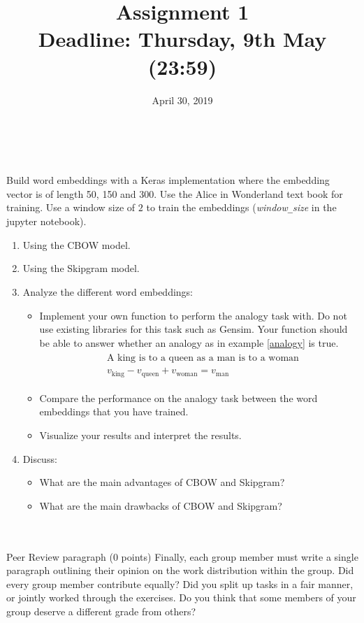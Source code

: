\documentclass[a4paper,twoside,11pt]{article}
\title{\vspace{-\baselineskip}\sffamily\bfseries Assignment 1 \\
\large Deadline: Thursday, 9th May (23:59)}
\date{April 30, 2019}
\newcommand{\exercise}[2]{\noindent{\bf Question #1 (#2pt):} \\\\ }
\begin{document}
\maketitle


\exercise{1}{5} Build word embeddings with a Keras implementation where the embedding vector is of length 50, 150 and 300. Use the Alice in Wonderland text book for training. Use a window size of $2$ to train the embeddings (\emph{window\texttt{\_}size} in the jupyter notebook).
\begin{enumerate}
\item Using the CBOW model.
\item Using the Skipgram model.
\item Analyze the different word embeddings:
\begin{itemize}
\item Implement your own function to perform the analogy task with\footnotemark. Do not use existing libraries for this task such as Gensim. Your function should be able to answer whether an analogy as in example \ref{analogy} is true. 
\begin{align}
\begin{split}
&\text{A king is to a queen as a man is to a woman} \\
&v_{\text{king}} - v_\text{queen} + v_\text{woman} = v_\text{man} 
\end{split}
\label{analogy}
\end{align} 
\item Compare the performance on the analogy task between the word embeddings that you have trained.
\item Visualize your results and interpret the results.
\end{itemize}
\item Discuss:
\begin{itemize}
\item What are the main advantages of CBOW and Skipgram?
\item What are the main drawbacks of CBOW and Skipgram?
\end{itemize}
\end{enumerate}

\exercise{2}{0}{Peer Review paragraph (0 points)}
Finally, each group member must write a single paragraph outlining their opinion on the work distribution within the group. Did every group member contribute equally? Did you split up tasks in a fair manner, or jointly worked through the exercises. Do you think that some members of your group deserve a different grade from others?
\end{document}

